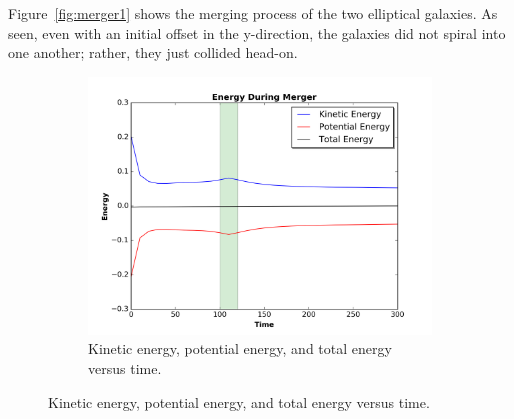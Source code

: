 \documentclass[12pt]{report}
\begin{document}
  Figure~\ref{fig:merger1} shows the merging process of the two elliptical galaxies. As seen, even with an initial offset in the y-direction, the galaxies did not spiral into one another; rather, they just collided head-on.
  
\begin{figure}[H]
\centering 
    \begin{subfigure}[b]{.475\textwidth}
        \centering
        \includegraphics[width=\linewidth]{Energy_of_merger-model1.png}
        \caption[]%
        {{Kinetic energy, potential energy, and total energy versus time.}}
        

\end{subfigure}
\end{figure}
\end{document}
